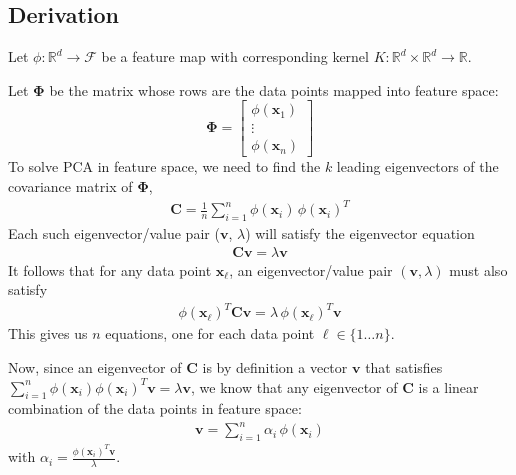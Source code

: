 \documentclass[]{article}
\newcommand{\reals}{\mathbb{R}}
\begin{document}

\subsection{Derivation}

Let $\phi: \reals^d \to \mathcal{F}$ be a feature map with corresponding kernel $K: \reals^d \times \reals^d \to \reals$.

Let  $\boldsymbol{\Phi}$ be the matrix whose rows are the data points mapped into feature space:
$$\boldsymbol{\Phi} = \begin{bmatrix} \phi(\mathbf{x}_1) \\ \vdots \\ \phi(\mathbf{x}_n) \end{bmatrix}$$
To solve PCA in feature space, we need to find the $k$ leading eigenvectors of the covariance matrix of $\mathbf{\Phi}$,
\begin{align}
 \mathbf{C} = \frac{1}{n} \sum_{i=1}^n \phi(\mathbf{x}_i) \, \phi(\mathbf{x}_i)^T
\end{align}
Each such eigenvector/value pair ($\mathbf{v}$, $\lambda$) will satisfy the eigenvector equation 
\begin{align*}
\mathbf{C} \mathbf{v} = \lambda \mathbf{v}
\end{align*}
It follows that for any data point $\mathbf{x}_{\ell}$, an eigenvector/value pair $(\mathbf{v}, \lambda)$ must also satisfy
\begin{align}
\label{ev-equation}
\phi(\mathbf{x}_{\ell})^T \mathbf{C} \mathbf{v} = \lambda \, \phi(\mathbf{x}_\ell)^T \mathbf{v}
\end{align}
This gives us $n$ equations, one for each data point $\ell \in \{1 \hdots n\}$.

Now, since an eigenvector of $\mathbf{C}$ is by definition a vector $\mathbf{v}$ that satisfies $\sum_{i=1}^n \phi(\mathbf{x}_i) \phi(\mathbf{x}_i)^T \mathbf{v} = \lambda \mathbf{v}$, we know that any eigenvector of $\mathbf{C}$ is a linear combination of the data points in feature space:
\begin{align}
\label{linear-combo}
\mathbf{v} = \sum_{i=1}^n \alpha_i \, \phi(\mathbf{x}_i)
\end{align}
with $\alpha_i  = \frac{\phi(\mathbf{x}_i)^T \mathbf{v}}{\lambda}$.
\end{document}
